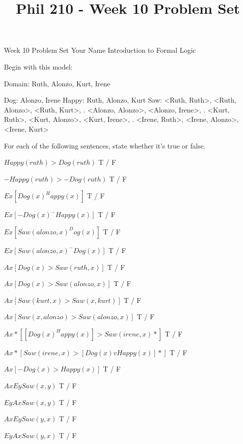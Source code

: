 
\title{Phil 210 - Week 10 Problem Set}

\heading
Week 10 Problem Set
Your Name
Introduction to Formal Logic
\endheading

Begin with this model:

\answer
        \firstordermodel 
        Domain: Ruth, Alonzo, Kurt, Irene

        Dog:    Alonzo, Irene
        Happy:  Ruth, Alonzo, Kurt
        Saw:    <Ruth, Ruth>, <Ruth, Alonzo>, <Ruth, Kurt>,
           .    <Alonzo, Alonzo>, <Alonzo, Irene>,
           .    <Kurt, Ruth>, <Kurt, Alonzo>, <Kurt, Irene>,
           .    <Irene, Ruth>, <Irene, Alonzo>, <Irene, Kurt>
        \endfirstordermodel
\endanswer\bigskip

For each of the following sentences, state whether it's true or false.

\quantifiers
\problems
{}
$ Happy(ruth) > Dog(ruth) $
        \answer
         T / F
        \endanswer

$ -Happy(ruth) > -Dog(ruth) $
        \answer
         T / F
        \endanswer

$ Ex[Dog(x) ^ Happy(x)] $
        \answer
         T / F
        \endanswer

$ Ex[-Dog(x) ^ -Happy(x)] $
        \answer
         T / F
        \endanswer

$ Ex[Saw(alonzo,x) ^ Dog(x)] $
        \answer
         T / F
        \endanswer

$ Ex[Saw(alonzo,x) ^ -Dog(x)] $
        \answer
         T / F
        \endanswer

$ Ax[Dog(x) > Saw(ruth,x)] $
        \answer
         T / F
        \endanswer

$ Ax[Dog(x) > Saw(alonzo,x)] $
        \answer
         T / F
        \endanswer

$ Ax[Saw(kurt,x) > Saw(x,kurt)] $
        \answer
         T / F
        \endanswer

$ Ax[Saw(x,alonzo) > Saw(alonzo,x)] $
        \answer
         T / F
        \endanswer

$ Ax*[[Dog(x) ^ Happy(x)] > Saw(irene,x)*] $
        \answer
         T / F
        \endanswer

$ Ax*[Saw(irene,x) > [Dog(x) v Happy(x)]*] $
        \answer
         T / F
        \endanswer

$ Ax[-Dog(x) > Happy(x)] $
        \answer
         T / F
        \endanswer

$ Ax Ey Saw(x,y) $
        \answer
         T / F
        \endanswer

$ Ey Ax Saw(x,y) $
        \answer
         T / F
        \endanswer

$ Ax Ey Saw(y,x) $
        \answer
         T / F
        \endanswer

$ Ey Ax Saw(y,x) $
        \answer
         T / F
        \endanswer

\endproblems
\bye
